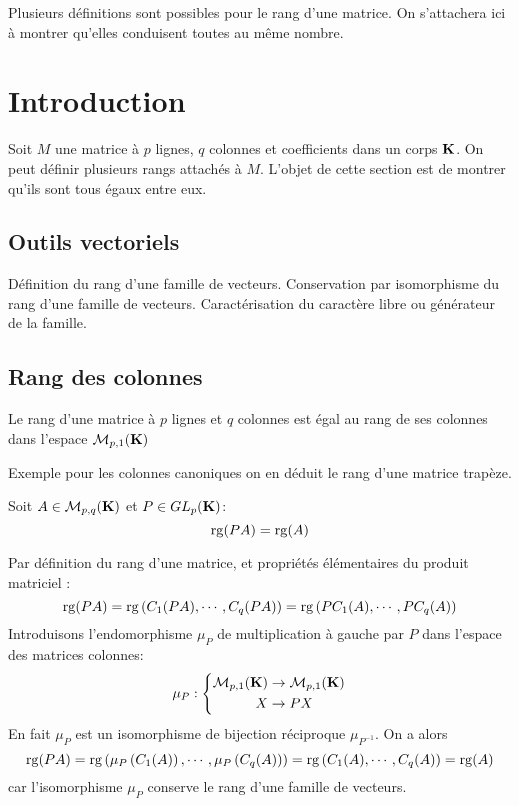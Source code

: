 


Plusieurs définitions sont possibles pour le rang d'une matrice. On s'attachera ici à montrer qu'elles conduisent toutes au même nombre.
\section{Introduction}
Soit $M$ une matrice à $p$ lignes, $q$ colonnes et coefficients dans un corps $\mathbf{K}$. On peut définir plusieurs rangs attachés à $M$. L'objet de cette section est de montrer qu'ils sont tous égaux entre eux.
\subsection{Outils vectoriels}
Définition du rang d'une famille de vecteurs. Conservation par isomorphisme du rang d'une famille de vecteurs. Caractérisation du caractère libre ou générateur de la famille.
\subsection{Rang des colonnes}
\begin{defi}
Le rang d'une matrice à $p$ lignes et $q$ colonnes est égal au rang de ses colonnes dans l'espace $\mathcal M_{p,1}(\mathbf{K})$
\end{defi}
Exemple pour les colonnes canoniques on en déduit le rang d'une matrice trapèze.
\begin{prop}
 Soit $A\in\mathcal M_{p,q}(\mathbf{K})$ et $P\in GL_{p}(\mathbf{K})$:
\begin{displaymath}
 \mathop{\mathrm{rg}}(PA) = \mathop{\mathrm{rg}}(A)
\end{displaymath}
\begin{demo}
Par définition du rang d'une matrice, et propriétés élémentaires du produit matriciel :
\begin{displaymath}
  \mathop{\mathrm{rg}}(PA) = \mathop{\mathrm{rg}}\left( C_1(PA),\cdots,C_q(PA)\right) 
= \mathop{\mathrm{rg}}\left( PC_1(A),\cdots,PC_q(A)\right)
\end{displaymath}
Introduisons l'endomorphisme $\mu_P$ de multiplication à gauche par $P$ dans l'espace des matrices colonnes:
\begin{displaymath}
 \mu_P :
\left\lbrace 
\begin{aligned}
 \mathcal M_{p,1}(\mathbf{K}) &\rightarrow \mathcal M_{p,1}(\mathbf{K}) \\
 X &\rightarrow PX
\end{aligned}
\right. 
\end{displaymath}
En fait $\mu_P$ est un isomorphisme de bijection réciproque $\mu_{P^{-1}}$. On a alors
\begin{displaymath}
 \mathop{\mathrm{rg}}(PA) =\mathop{\mathrm{rg}}\left( \mu_P\left( C_1(A)\right) ,\cdots,\mu_P\left( C_q(A)\right) \right)
= \mathop{\mathrm{rg}}\left( C_1(A),\cdots,C_q(A)\right) = \mathop{\mathrm{rg}} (A)
\end{displaymath}
car l'isomorphisme $\mu_P$ conserve le rang d'une famille de vecteurs.
\end{demo}
\end{prop}

